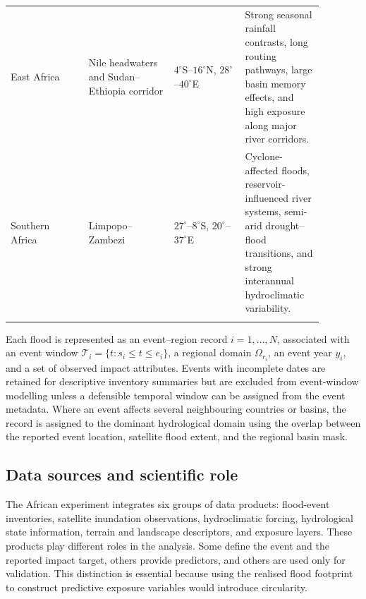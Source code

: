 \documentclass[pdflatex,sn-mathphys-ay]{sn-jnl}
\theoremstyle{thmstyleone}
\theoremstyle{thmstylethree}
\theoremstyle{thmstyletwo}
\begin{document}
\begin{appendices}
\begin{table}[t]
\begin{tabular}{p{0.22\linewidth}p{0.24\linewidth}
                p{0.20\linewidth}p{0.22\linewidth}}
East Africa
&
Nile headwaters and Sudan--Ethiopia corridor
&
$4^{\circ}$S--$16^{\circ}$N,
$28^{\circ}$--$40^{\circ}$E
&
Strong seasonal rainfall contrasts, long routing pathways,
large basin memory effects, and high exposure along major river
corridors. \\

Southern Africa
&
Limpopo--Zambezi
&
$27^{\circ}$--$8^{\circ}$S,
$20^{\circ}$--$37^{\circ}$E
&
Cyclone-affected floods, reservoir-influenced river systems,
semi-arid drought--flood transitions, and strong interannual
hydroclimatic variability. \\
\botrule
\end{tabular}
\end{table}

Each flood is represented as an event--region record
$i=1,\ldots,N$, associated with an event window
$\mathcal{T}_{i}=\{t:s_i\leq t\leq e_i\}$, a regional domain
$\Omega_{r_i}$, an event year $y_i$, and a set of observed impact
attributes.  Events with incomplete dates are retained for descriptive
inventory summaries but are excluded from event-window modelling
unless a defensible temporal window can be assigned from the event
metadata.  Where an event affects several neighbouring countries or
basins, the record is assigned to the dominant hydrological domain
using the overlap between the reported event location, satellite
flood extent, and the regional basin mask.

\subsection{Data sources and scientific role}
\label{app:data_sources}

The African experiment integrates six groups of data products:
flood-event inventories, satellite inundation observations,
hydroclimatic forcing, hydrological state information, terrain and
landscape descriptors, and exposure layers.  These products play
different roles in the analysis.  Some define the event and the
reported impact target, others provide predictors, and others are used
only for validation.  This distinction is essential because using the
realised flood footprint to construct predictive exposure variables
would introduce circularity.


\end{appendices}
\end{document}

